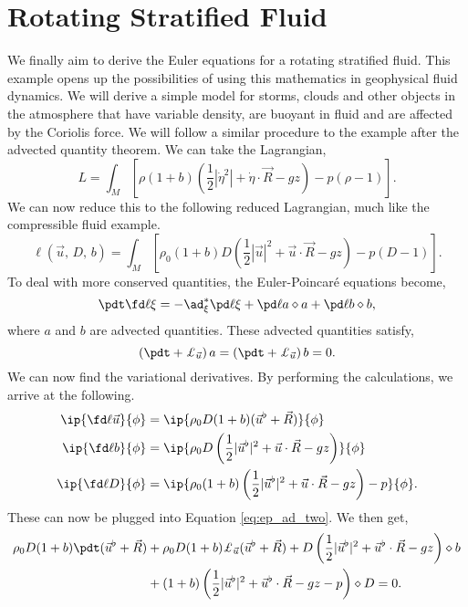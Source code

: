 
\section{Rotating Stratified Fluid}
We finally aim to derive the Euler equations for a rotating stratified fluid. This example opens up the possibilities of using this mathematics in geophysical fluid dynamics. We will derive a simple model for storms, clouds and other objects in the atmosphere that have variable density, are buoyant in fluid and are affected by the Coriolis force. We will follow a similar procedure to the example after the advected quantity theorem. We can take the Lagrangian,
$$ L = \int_M \left[ \rho (1 + b)\left( \frac{1}{2}|\dot\eta^2| + \dot \eta \cdot \vec R - gz \right) - p(\rho - 1) \right]. $$
We can now reduce this to the following reduced Lagrangian, much like the compressible fluid example.
$$ \ell(\vec u,\, D,\, b) = \int_M \left[ \rho_0(1 + b)D \left( \frac{1}{2}|\vec u|^2 + \vec u \cdot \vec R - gz \right) - p(D-1) \right]. $$
To deal with more conserved quantities, the Euler-Poincar\'e equations become,
\begin{equation}
  \pdt \fd \ell \xi = -\ad^*_\xi \pd \ell \xi + \pd \ell a \diamond a + \pd \ell b \diamond b,\label{eq:ep_ad_two}
\end{equation}
where $a$ and $b$ are advected quantities. These advected quantities satisfy,
$$ \left( \pdt + \pounds_{\vec u} \right)a = \left( \pdt + \pounds_{\vec u} \right)b = 0. $$
\noindent
We can now find the variational derivatives. By performing the calculations, we arrive at the following.
\begin{align*}
  \ip{\fd \ell {\vec u}}{\phi} &= \ip{\rho_0 D (1 + b)(\vec u^\flat + \vec R )}{\phi} \\
  \ip{\fd \ell b}{\phi} &= \ip{\rho_0 D \left( \frac{1}{2}|\vec u^\flat|^2 + \vec u \cdot \vec R - gz \right)}{\phi} \\
  \ip{\fd \ell D}{\phi} &= \ip{\rho_0 (1+b) \left( \frac{1}{2}|\vec u^\flat|^2 + \vec u \cdot \vec R - gz \right) - p}{\phi}.
\end{align*}
These can now be plugged into Equation \eqref{eq:ep_ad_two}. We then get,
\begin{align*}
  \rho_0 D(1 + b)\pdt (\vec u^\flat + \vec R) &+ \rho_0 D(1 + b)\pounds_{\vec u} (\vec u^\flat + \vec R) + D\left(\frac{1}{2}|\vec u^\flat|^2 + \vec u^\flat \cdot \vec R - gz\right) \diamond b \\
  &+ (1+ b)\left(\frac{1}{2}|\vec u^\flat|^2 + \vec u^\flat \cdot \vec R - gz - p\right) \diamond D = 0.
\end{align*}
